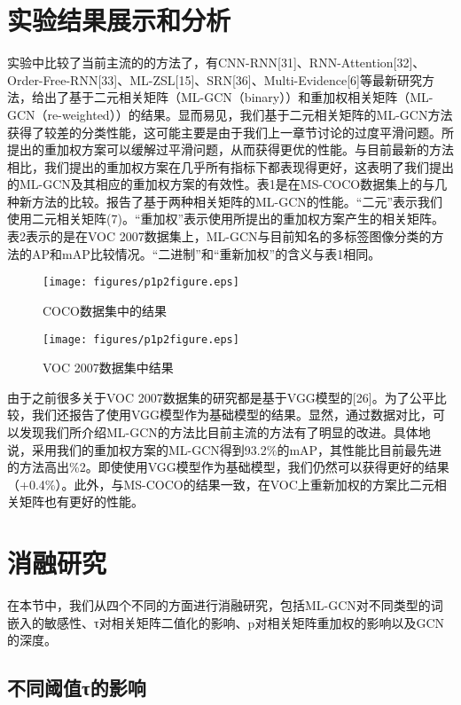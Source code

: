 \section{实验结果展示和分析}
实验中比较了当前主流的的方法了，有CNN-RNN[31]、RNN-Attention[32]、Order-Free-RNN[33]、ML-ZSL[15]、SRN[36]、Multi-Evidence[6]等最新研究方法，给出了基于二元相关矩阵（ML-GCN（binary））和重加权相关矩阵（ML-GCN（re-weighted））的结果。显而易见，我们基于二元相关矩阵的ML-GCN方法获得了较差的分类性能，这可能主要是由于我们上一章节讨论的过度平滑问题。所提出的重加权方案可以缓解过平滑问题，从而获得更优的性能。与目前最新的方法相比，我们提出的重加权方案在几乎所有指标下都表现得更好，这表明了我们提出的ML-GCN及其相应的重加权方案的有效性。表1是在MS-COCO数据集上的与几种新方法的比较。报告了基于两种相关矩阵的ML-GCN的性能。“二元”表示我们使用二元相关矩阵(7)。“重加权”表示使用所提出的重加权方案产生的相关矩阵。表2表示的是在VOC 2007数据集上，ML-GCN与目前知名的多标签图像分类的方法的AP和mAP比较情况。“二进制”和“重新加权”的含义与表1相同。

\begin{figure}[htbp!]
	\centering
	\texttt{[image: figures/p1p2figure.eps]}
	\caption{COCO数据集中的结果}\label{fig:simuP1P2Result}
	\vspace{-1em}
\end{figure}

\begin{figure}[htbp!]
	\centering
	\texttt{[image: figures/p1p2figure.eps]}
	\caption{VOC 2007数据集中结果}\label{fig:simuP1P2Result}
	\vspace{-1em}
\end{figure}

由于之前很多关于VOC 2007数据集的研究都是基于VGG模型的[26]。为了公平比较，我们还报告了使用VGG模型作为基础模型的结果。显然，通过数据对比，可以发现我们所介绍ML-GCN的方法比目前主流的方法有了明显的改进。具体地说，采用我们的重加权方案的ML-GCN得到93.2\%的mAP，其性能比目前最先进的方法高出\%2。即使使用VGG模型作为基础模型，我们仍然可以获得更好的结果（+0.4\%）。此外，与MS-COCO的结果一致，在VOC上重新加权的方案比二元相关矩阵也有更好的性能。

\section{消融研究}
在本节中，我们从四个不同的方面进行消融研究，包括ML-GCN对不同类型的词嵌入的敏感性、τ对相关矩阵二值化的影响、p对相关矩阵重加权的影响以及GCN的深度。

\subsection{不同阈值τ的影响}

